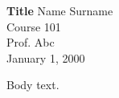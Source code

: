 \documentclass[12pt, letterpaper]{article}
\begin{document}
\thispagestyle{empty}
\begin{center}
    \vspace*{0.25\textheight}
    \textbf{Title}
    \vfill
    Name Surname \\
    Course 101 \\
    Prof. Abc \\
    January 1, 2000
    \vspace*{0.33\textheight}
\end{center}
\newpage
\setcounter{page}{1}


Body text.

\end{document}
